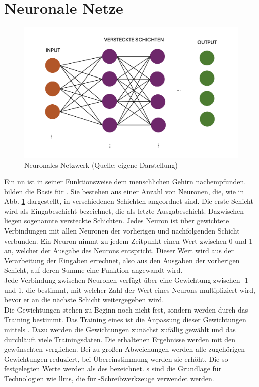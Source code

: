\documentclass[../main.tex]{subfiles}
\begin{document}
\section{Neuronale Netze}

\begin{figure}[h!]
  \includegraphics[scale=0.6]{bilder/NeuralNetwork.png}
  \caption{Neuronales Netzwerk (Quelle: eigene Darstellung)}
  \label{fig:NN}
\end{figure}

Ein \gls{nn} ist in seiner Funktionsweise dem menschlichen Gehirn nachempfunden.  bilden die Basis für . Sie bestehen aus einer Anzahl von Neuronen, 
die, wie in Abb. \ref{fig:NN} dargestellt, in verschiedenen Schichten angeordnet sind. Die erste Schicht wird als Eingabeschicht bezeichnet, die als letzte Ausgabeschicht. Dazwischen liegen 
sogenannte versteckte Schichten. Jedes Neuron ist über gewichtete Verbindungen mit allen Neuronen der vorherigen und nachfolgenden Schicht verbunden. Ein Neuron nimmt zu jedem Zeitpunkt 
einen Wert zwischen 0 und 1 an, welcher der Ausgabe des Neurons entspricht. Dieser Wert wird aus der Verarbeitung der Eingaben errechnet, also aus den Ausgaben der vorherigen Schicht, auf 
deren Summe eine Funktion angewandt wird. \\
Jede Verbindung zwischen Neuronen verfügt über eine Gewichtung zwischen -1 und 1, die bestimmt, mit welcher Zahl der Wert eines Neurons multipliziert wird, bevor er an die nächste Schicht 
weitergegeben wird. \\
Die Gewichtungen stehen zu Beginn noch nicht fest, sondern werden durch das Training bestimmt. Das Training eines  ist die Anpassung dieser Gewichtungen 
mittels . Dazu werden die Gewichtungen zunächst zufällig gewählt und das  durchläuft viele Trainingsdaten. Die erhaltenen 
Ergebnisse werden mit den gewünschten verglichen. Bei zu großen Abweichungen werden alle zugehörigen Gewichtungen reduziert, bei Übereinstimmung werden sie erhöht. Die so festgelegten Werte 
werden als  des  bezeichnet. s sind die Grundlage für Technologien wie \glspl{llm}, die für 
-Schreibwerkzeuge verwendet werden. 
\end{document}
